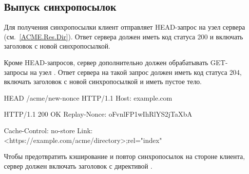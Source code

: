 \subsection{Выпуск синхропосылок}\label{ACME.Transport.Nonce}

Для получения синхропосылки клиент отправляет HEAD-запрос на узел 
 сервера (см.~\ref{ACME.Res.Dir}). 
%
Ответ сервера должен иметь код статуса 200 и включать заголовок 
 с новой синхропосылкой. 

Кроме HEAD-запросов, сервер дополнительно должен обрабатывать GET-запросы на 
узел .
%
Ответ сервера на такой запрос должен иметь код статуса 204, включать заголовок  
 с новой синхропосылкой и иметь пустое тело.


HEAD /acme/new-nonce HTTP/1.1
Host: example.com

HTTP/1.1 200 OK
Replay-Nonce: oFvnlFP1wIhRlYS2jTaXbA

Cache-Control: no-store
Link: <https://example.com/acme/directory>;rel="index"
\fi

Чтобы предотвратить кэширование и повтор синхропосылок на стороне клиента,
сервер должен включать заголовок  с директивой 
.


